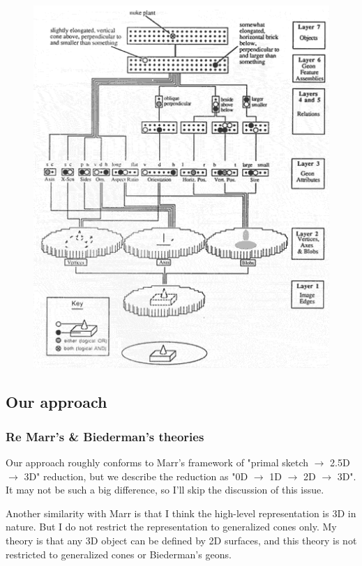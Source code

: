 \begin{figure}[H]
\centering
\includegraphics[scale=0.6,bb=0 0 431 529]{BiedermanHummelNN.PNG}
\end{figure}

\subsection{Our approach}

\subsubsection{Re Marr's \& Biederman's theories}

Our approach roughly conforms to Marr's framework of  "primal sketch $\rightarrow$ 2.5D $\rightarrow$ 3D" reduction, but we describe the reduction as "0D $\rightarrow$ 1D $\rightarrow$ 2D $\rightarrow$ 3D". It may not be such a big difference, so I'll skip the discussion of this issue.

Another similarity with Marr is that I think the high-level representation is 3D in nature. But I do not restrict the representation to generalized cones only. My theory is that any 3D object can be defined by 2D surfaces, and this theory is not restricted to generalized cones or Biederman's geons.

